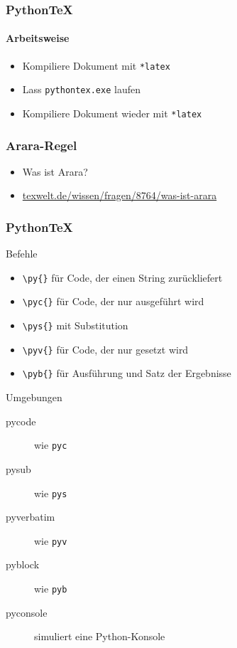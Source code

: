 \documentclass[12pt,ngerman]{beamer}
\begin{document}
\begin{frame}
\frametitle{Python\TeX}
\framesubtitle{Arbeitsweise}

\begin{itemize}
	\item Kompiliere Dokument mit \texttt{*latex}
	\item Lass \texttt{pythontex.exe} laufen
	\item Kompiliere Dokument wieder mit \texttt{*latex}
\end{itemize}

\end{frame}


\begin{frame}[fragile]
\frametitle{Arara-Regel}

\begin{itemize}
	\item Was ist Arara?
	\item \url{texwelt.de/wissen/fragen/8764/was-ist-arara}
\end{itemize}

 
\end{frame}


\begin{frame}[fragile]
\frametitle{Python\TeX}

Befehle

\begin{itemize}
\item \verb|\py{}|  für Code, der einen String zurückliefert
\item \verb|\pyc{}|  für Code, der nur ausgeführt wird
\item \verb|\pys{}|  mit Substitution
\item \verb|\pyv{}|  für Code, der nur gesetzt wird
\item \verb|\pyb{}|  für Ausführung und Satz der Ergebnisse
\end{itemize}

Umgebungen

\begin{description}
\item[pycode] wie \texttt{pyc}
\item[pysub] wie \texttt{pys}
\item[pyverbatim] wie \texttt{pyv}
\item[pyblock] wie \texttt{pyb}
\item[pyconsole] simuliert eine Python-Konsole
\end{description}

\end{frame}
\end{document}
